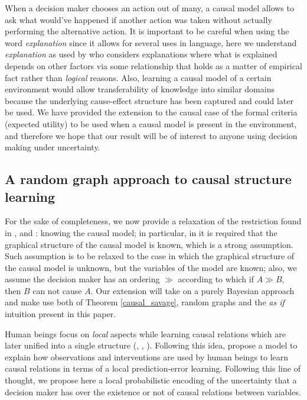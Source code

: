 \documentclass{svjour3}                     %
\begin{document}
When a decision maker chooses an action out of many, a causal model allows to ask what would've happened if another action was taken without actually performing the alternative action. It is important to be careful when using the word \textit{explanation} since it allows for several uses in language, here we understand \textit{explanation} as used by \cite{woodward2005making} who considers explanations where what is explained depends on other factors via some relationship that holds as a matter of empirical fact rather than \textit{logical} reasons. Also, learning a causal model of a certain environment would allow transferability of knowledge into similar domains because the underlying cause-effect structure has been captured and could later be used. We have provided the extension to the causal case of the formal criteria (expected utility) to be used when a causal model is present in the environment, and therefore we hope that our result will be of interest to anyone using decision making under uncertainty. 

\subsection{A random graph approach to causal structure learning}
\label{random_graphs}
For the sake of completeness, we now provide a relaxation of the restriction found in \cite{lattimoreNIPS2016}, \cite{sen2017identifying} and \cite{gonzalez2018playing}: knowing the causal model; in particular, in \cite{gonzalez2018playing} it is required that the graphical structure of the causal model is known, which is a strong assumption. Such assumption is to be relaxed to the case in which the graphical structure of the causal model is unknown, but the variables of the model are known; also, we assume the decision maker has an ordering $\gg$ according to which if $A \gg B$, then $B$ can not cause $A$. Our extension will take on a purely Bayesian approach and make use both of Theorem \ref{causal_savage}, random graphs and the \textit{as if} intuition present in this paper.

Human beings focus on \textit{local} aspects while learning causal relations which are later unified into a single structure (\cite{fernbach2009causal}, \cite{waldmann2008causal},  \cite{danks2014unifying}). Following this idea, \cite{wellen2012learning} propose a model to explain how observations  and interventions are used by human beings to learn causal relations in terms of a local prediction-error learning. Following this line of thought, we propose here a local probabilistic encoding of the uncertainty that a decision maker has over the existence or not of causal relations between variables.
\end{document}
